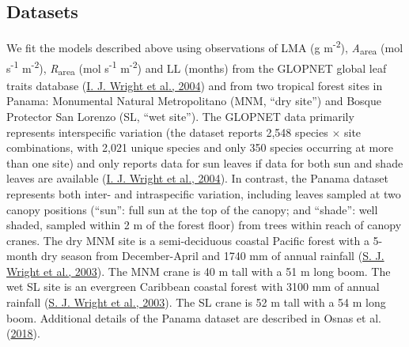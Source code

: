 \documentclass[
  12pt,
  a4paper,
,tablecaptionabove
]{scrartcl}
\begin{document}
\hypertarget{datasets}{%
\subsection{Datasets}\label{datasets}}

We fit the models described above using observations of LMA (g
m\textsuperscript{-2}), \emph{A}\textsubscript{area} (mol
s\textsuperscript{-1} m\textsuperscript{-2}),
\emph{R}\textsubscript{area} (mol s\textsuperscript{-1}
m\textsuperscript{-2}) and LL (months) from the GLOPNET global leaf
traits database (\protect\hyperlink{ref-Wright2004a}{I. J. Wright et
al., 2004}) and from two tropical forest sites in Panama: Monumental
Natural Metropolitano (MNM, ``dry site'') and Bosque Protector San
Lorenzo (SL, ``wet site''). The GLOPNET data primarily represents
interspecific variation (the dataset reports 2,548 species \(\times\)
site combinations, with 2,021 unique species and only 350 species
occurring at more than one site) and only reports data for sun leaves if
data for both sun and shade leaves are available
(\protect\hyperlink{ref-Wright2004a}{I. J. Wright et al., 2004}). In
contrast, the Panama dataset represents both inter- and intraspecific
variation, including leaves sampled at two canopy positions (``sun'':
full sun at the top of the canopy; and ``shade'': well shaded, sampled
within 2 m of the forest floor) from trees within reach of canopy
cranes. The dry MNM site is a semi-deciduous coastal Pacific forest with
a 5-month dry season from December-April and 1740 mm of annual rainfall
(\protect\hyperlink{ref-Wright2003}{S. J. Wright et al., 2003}). The MNM
crane is 40 m tall with a 51 m long boom. The wet SL site is an
evergreen Caribbean coastal forest with 3100 mm of annual rainfall
(\protect\hyperlink{ref-Wright2003}{S. J. Wright et al., 2003}). The SL
crane is 52 m tall with a 54 m long boom. Additional details of the
Panama dataset are described in Osnas et al.
(\protect\hyperlink{ref-Osnas2018}{2018}).
\end{document}
